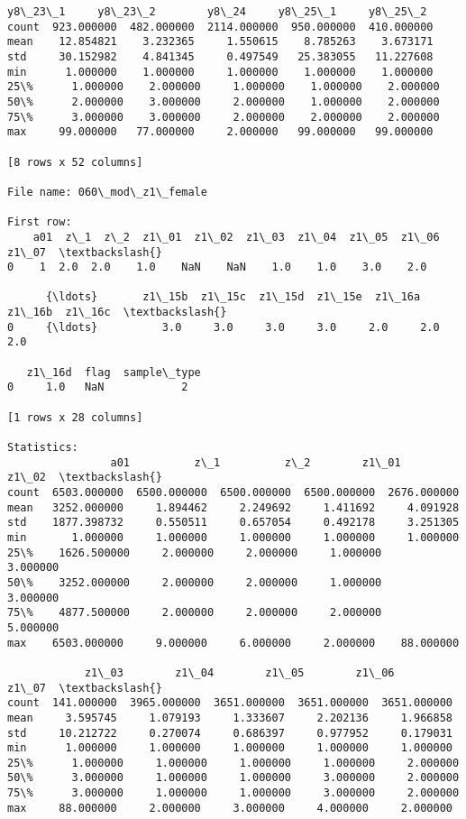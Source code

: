 \documentclass[11pt]{article}
\begin{document}
\begin{Verbatim}[commandchars=\\\{\}]
          y8\_23\_1     y8\_23\_2        y8\_24     y8\_25\_1     y8\_25\_2  
count  923.000000  482.000000  2114.000000  950.000000  410.000000  
mean    12.854821    3.232365     1.550615    8.785263    3.673171  
std     30.152982    4.841345     0.497549   25.383055   11.227608  
min      1.000000    1.000000     1.000000    1.000000    1.000000  
25\%      1.000000    2.000000     1.000000    1.000000    2.000000  
50\%      2.000000    3.000000     2.000000    1.000000    2.000000  
75\%      3.000000    3.000000     2.000000    2.000000    2.000000  
max     99.000000   77.000000     2.000000   99.000000   99.000000  

[8 rows x 52 columns]

File name: 060\_mod\_z1\_female

First row: 
    a01  z\_1  z\_2  z1\_01  z1\_02  z1\_03  z1\_04  z1\_05  z1\_06  z1\_07  \textbackslash{}
0    1  2.0  2.0    1.0    NaN    NaN    1.0    1.0    3.0    2.0   

      {\ldots}       z1\_15b  z1\_15c  z1\_15d  z1\_15e  z1\_16a  z1\_16b  z1\_16c  \textbackslash{}
0     {\ldots}          3.0     3.0     3.0     3.0     2.0     2.0     2.0   

   z1\_16d  flag  sample\_type  
0     1.0   NaN            2  

[1 rows x 28 columns]

Statistics: 
                a01          z\_1          z\_2        z1\_01        z1\_02  \textbackslash{}
count  6503.000000  6500.000000  6500.000000  6500.000000  2676.000000   
mean   3252.000000     1.894462     2.249692     1.411692     4.091928   
std    1877.398732     0.550511     0.657054     0.492178     3.251305   
min       1.000000     1.000000     1.000000     1.000000     1.000000   
25\%    1626.500000     2.000000     2.000000     1.000000     3.000000   
50\%    3252.000000     2.000000     2.000000     1.000000     3.000000   
75\%    4877.500000     2.000000     2.000000     2.000000     5.000000   
max    6503.000000     9.000000     6.000000     2.000000    88.000000   

            z1\_03        z1\_04        z1\_05        z1\_06        z1\_07  \textbackslash{}
count  141.000000  3965.000000  3651.000000  3651.000000  3651.000000   
mean     3.595745     1.079193     1.333607     2.202136     1.966858   
std     10.212722     0.270074     0.686397     0.977952     0.179031   
min      1.000000     1.000000     1.000000     1.000000     1.000000   
25\%      1.000000     1.000000     1.000000     1.000000     2.000000   
50\%      3.000000     1.000000     1.000000     3.000000     2.000000   
75\%      3.000000     1.000000     1.000000     3.000000     2.000000   
max     88.000000     2.000000     3.000000     4.000000     2.000000   


\end{Verbatim}
\end{document}
